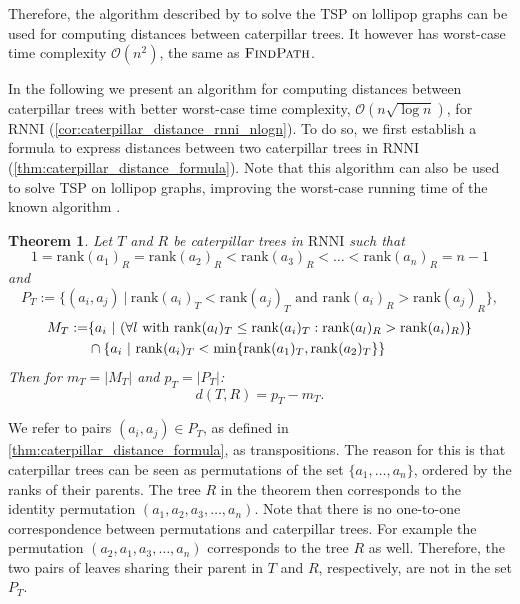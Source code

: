 \documentclass[11pt]{amsart}
\newtheorem{theorem}{Theorem}
\newcommand{\rnni}{\mathrm{RNNI}}
\newcommand{\findpath}{\textsc{FindPath}}
\newcommand{\rank}{\mathrm{rank}}
\renewcommand{\O}{\mathcal O}
\begin{document}
Therefore, the algorithm described by \textcite{Kawahara2017-ey} to solve the TSP on lollipop graphs can be used for computing distances between caterpillar trees.
It however has worst-case time complexity $\O(n^2)$, the same as $\findpath$.

In the following we present an algorithm for computing distances between caterpillar trees with better worst-case time complexity, $\O(n \sqrt{\log n})$, for $\rnni$ (\autoref{cor:caterpillar_distance_rnni_nlogn}).
To do so, we first establish a formula to express distances between two caterpillar trees in $\rnni$ (\autoref{thm:caterpillar_distance_formula}).
Note that this algorithm can also be used to solve TSP on lollipop graphs, improving the worst-case running time of the known algorithm \autocite{Kawahara2017-ey}.

\begin{theorem}
	Let $T$ and $R$ be caterpillar trees in $\rnni$ such that \[1 = \rank(a_1)_R = \rank(a_2)_R < \rank(a_3)_R < \ldots < \rank(a_n)_R = n-1\]
	and
	\[P_T := \{(a_i,a_j)\ |\  \rank(a_i)_T < \rank(a_j)_T \text{ and } \rank(a_i)_R > \rank(a_j)_R\},\]
	\begin{align*}
		M_T := &\{a_i\ |\  (\forall l \textnormal{ with } \rank(a_l)_T \leq \rank(a_i)_T: \rank(a_l)_R > \rank(a_i)_R)\} \\
		& \cap \{a_i \ |\  \rank(a_i)_T < \min\{\rank(a_1)_T, \rank(a_2)_T\}\}
	\end{align*}
	Then for ${m_T = |M_T|}$ and ${p_T = |P_T|}$:
	\[d(T,R) = p_T - m_T.\]
	\label{thm:caterpillar_distance_formula}
\end{theorem}

We refer to pairs $(a_i,a_j) \in P_T$, as defined in \autoref{thm:caterpillar_distance_formula}, as transpositions.
The reason for this is that caterpillar trees can be seen as permutations of the set $\{a_1, \ldots, a_n\}$, ordered by the ranks of their parents.
The tree $R$ in the theorem then corresponds to the identity permutation $(a_1, a_2, a_3, \ldots, a_n)$.
Note that there is no one-to-one correspondence between permutations and caterpillar trees.
For example the permutation $(a_2, a_1, a_3, \ldots, a_n)$ corresponds to the tree $R$ as well.
Therefore, the two pairs of leaves sharing their parent in $T$ and $R$, respectively, are not in the set $P_T$.
\end{document}

